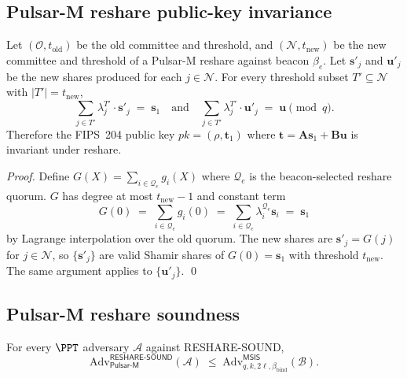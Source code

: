 
\subsection*{Pulsar-M reshare public-key invariance}

\begin{theorem}
\label{thm:pulsar-m-reshare-pkinv}
Let $(\mathcal{O}, t_{\mathrm{old}})$ be the old committee and
threshold, and $(\mathcal{N}, t_{\mathrm{new}})$ be the new committee
and threshold of a Pulsar-M reshare against beacon $\beta_e$. Let
$\mathbf{s}'_j$ and $\mathbf{u}'_j$ be the new shares produced for
each $j \in \mathcal{N}$. For every threshold subset $T' \subseteq
\mathcal{N}$ with $|T'| = t_{\mathrm{new}}$,
\[
  \sum_{j \in T'} \lambda_j^{T'} \cdot \mathbf{s}'_j \;=\; \mathbf{s}_1
  \quad\text{and}\quad
  \sum_{j \in T'} \lambda_j^{T'} \cdot \mathbf{u}'_j \;=\; \mathbf{u} \pmod q.
\]
Therefore the FIPS~204 public key $\mathit{pk} = (\rho, \mathbf{t}_1)$
where $\mathbf{t} = \mathbf{A} \mathbf{s}_1 + \mathbf{B} \mathbf{u}$
is invariant under reshare.
\end{theorem}

\begin{proof}
Define $G(X) = \sum_{i \in \mathcal{Q}_e} g_i(X)$ where
$\mathcal{Q}_e$ is the beacon-selected reshare quorum. $G$ has
degree at most $t_{\mathrm{new}} - 1$ and constant term
\[
  G(0) \;=\; \sum_{i \in \mathcal{Q}_e} g_i(0)
  \;=\; \sum_{i \in \mathcal{Q}_e} \lambda_i^{\mathcal{Q}_e} \mathbf{s}_i
  \;=\; \mathbf{s}_1
\]
by Lagrange interpolation over the old quorum. The new shares are
$\mathbf{s}'_j = G(j)$ for $j \in \mathcal{N}$, so
$\{\mathbf{s}'_j\}$ are valid Shamir shares of $G(0) = \mathbf{s}_1$
with threshold $t_{\mathrm{new}}$. The same argument applies to
$\{\mathbf{u}'_j\}$. \qed
\end{proof}

\subsection*{Pulsar-M reshare soundness}

\begin{theorem}
\label{thm:pulsar-m-reshare-sound}
For every $\PPT$ adversary $\mathcal{A}$ against RESHARE-SOUND,
\[
  \mathrm{Adv}^{\mathsf{RESHARE\text{-}SOUND}}_{\mathsf{Pulsar\text{-}M}}(\mathcal{A})
  \;\le\;
  \mathrm{Adv}^{\mathsf{MSIS}}_{q, k, 2\ell, \beta_{\mathrm{bind}}}(\mathcal{B}).
\]
\end{theorem}


